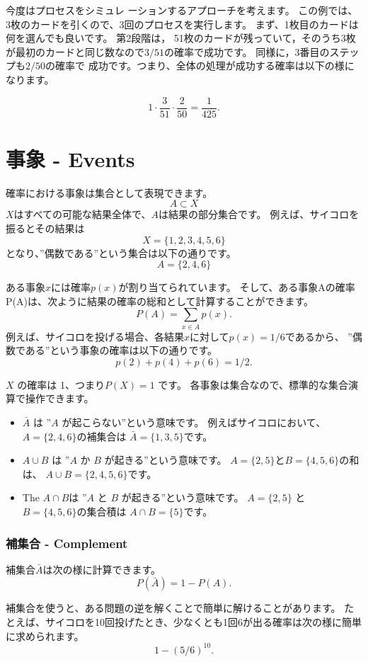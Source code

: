 今度はプロセスをシミュレ ーションするアプローチを考えます。
この例では、3枚のカードを引くので、3回のプロセスを実行します。
まず、1枚目のカードは何を選んでも良いです。
第2段階は， 51枚のカードが残っていて，そのうち3枚が最初のカードと同じ数なので$3/51$の確率で成功です。
同様に，3番目のステップも$2/50$の確率で 成功です。つまり、全体の処理が成功する確率は以下の様になります。

\[1 \cdot \frac{3}{51} \cdot \frac{2}{50} = \frac{1}{425}.\]

\section{事象 - Events}

確率における事象は集合として表現できます。
\[A \subset X\]
$X$はすべての可能な結果全体で、$A$は結果の部分集合です。
例えば、サイコロを振るとその結果は
\[X = \{1,2,3,4,5,6\}\]
となり、''偶数である''という集合は以下の通りです。
\[A = \{2,4,6\}\]

ある事象$x$には確率$p(x)$が割り当てられています。
そして、ある事象Aの確率P(A)は、次ように結果の確率の総和として計算することができます。
\[P(A) = \sum_{x \in A} p(x).\]
例えば、サイコロを投げる場合、各結果$x$に対して$p(x)=1/6$であるから、
''偶数である''という事象の確率は以下の通りです。
\[p(2)+p(4)+p(6)=1/2.\]

$X$ の確率は 1、つまり$P(X )=1$ です。
各事象は集合なので、標準的な集合演算で操作できます。

\begin{itemize}
\item {} $\bar A$ は
''$A$ が起こらない''という意味です。
例えばサイコロにおいて、$A=\{2,4,6\}$の補集合は
$\bar A = \{1,3,5\}$です。
\item {} $A \cup B$ は
''$A$ か $B$ が起きる''という意味です。
$A=\{2,5\}$と$B=\{4,5,6\}$の和は、
$A \cup B = \{2,4,5,6\}$です。
\item The  $A \cap B$は
''$A$ と $B$ が起きる''という意味です。
$A=\{2,5\}$ と $B=\{4,5,6\}$の集合積は
$A \cap B = \{5\}$です。
\end{itemize}

\subsubsection{補集合 - Complement}

補集合$\bar A$は次の様に計算できます。
\[P(\bar A)=1-P(A).\]

補集合を使うと、ある問題の逆を解くことで簡単に解けることがあります。
たとえば、サイコロを10回投げたとき、少なくとも1回6が出る確率は次の様に簡単に求められます。
\[1-(5/6)^{10}.\]

